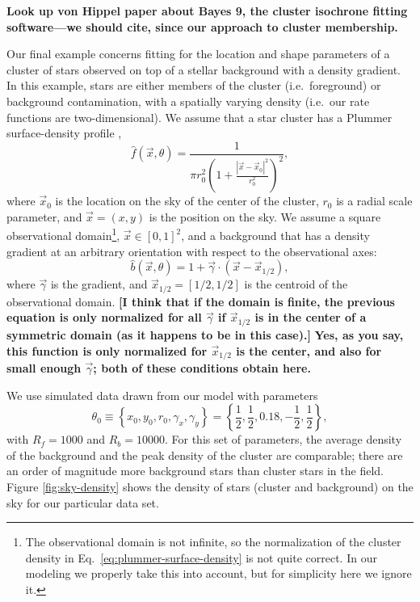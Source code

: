 \documentclass[aps,prd]{revtex4-1}
\newcommand{\ilya}[1]{{\color{red} \bf #1}}
\newcommand{\will}[1]{{\color{blue} \bf #1}}
\begin{document}
\will{Look up von Hippel paper about Bayes 9, the cluster isochrone
  fitting software---we should cite, since our approach to cluster
  membership.}

Our final example concerns fitting for the location and shape
parameters of a cluster of stars observed on top of a stellar
background with a density gradient.  In this example, stars are either
members of the cluster (i.e.~foreground) or background contamination,
with a spatially varying density (i.e.~our rate functions are
two-dimensional).  We assume that a star cluster has a Plummer
surface-density profile \citep{Plummer1911,Aarseth1974},
\begin{equation}
  \label{eq:plummer-surface-density}
  \hat{f}(\vec{x}, \theta) = \frac{1}{\pi r_0^2 \left( 1 +
    \frac{\left| \vec{x} - \vec{x}_0 \right|^2}{r_0^2} \right)^2},
\end{equation}
where $\vec{x}_0$ is the location on the sky of the center of the
cluster, $r_0$ is a radial scale parameter, and $\vec{x} = \left( x, y
\right)$ is the position on the sky.  We assume a square observational
domain\footnote{The observational domain is not infinite, so the
  normalization of the cluster density in
  Eq.~\eqref{eq:plummer-surface-density} is not quite correct.  In our
  modeling we properly take this into account, but for simplicity here
  we ignore it.}, $\vec{x} \in [0,1]^2$, and a background that has a
density gradient at an arbitrary orientation with respect to the
observational axes:
\begin{equation}
  \hat{b}\left(\vec{x}, \theta\right) = 1 + \vec{\gamma} \cdot \left(
  \vec{x} - \vec{x}_{1/2} \right),
\end{equation}
where $\vec{\gamma}$ is the gradient, and $\vec{x}_{1/2} = [1/2, 1/2]$
is the centroid of the observational domain.  \ilya{[I think that if
    the domain is finite, the previous equation is only normalized for
    all $\vec{\gamma}$ if $\vec{x}_{1/2}$ is in the center of a
    symmetric domain (as it happens to be in this case).]}  \will{Yes,
  as you say, this function is only normalized for $\vec{x}_{1/2}$ is
  the center, and also for small enough $\vec{\gamma}$; both of these
  conditions obtain here.}

We use simulated data drawn from our model with parameters
\begin{equation}
\label{eq:true-cluster-parameters}
\theta_0 \equiv \left\{ x_0, y_0, r_0, \gamma_x, \gamma_y \right\} =
\left\{ \frac{1}{2}, \frac{1}{2}, 0.18, -\frac{1}{2}, \frac{1}{2}
\right\},
\end{equation}
with $R_f = 1000$ and $R_b = 10000$.  For this set of parameters, the
average density of the background and the peak density of the cluster
are comparable; there are an order of magnitude more background stars
than cluster stars in the field.  Figure \ref{fig:sky-density} shows
the density of stars (cluster and background) on the sky for our
particular data set.
\end{document}
